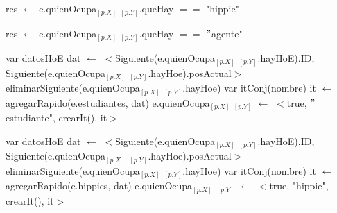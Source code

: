 \begin{algorithm}[H]
\begin{algorithmic}[1]
 
    \State res $\gets$ e.quienOcupa$_{[p.X]}$ $_{[p.Y]}$.queHay $==$ "hippie"
\EndFunction
\end{algorithmic}
\end{algorithm}

\begin{algorithm}[H]
\begin{algorithmic}[1]
 
    \State res $\gets$ e.quienOcupa$_{[p.X]}$ $_{[p.Y]}$.queHay $==$ $"$agente"
\EndFunction
\end{algorithmic}
\end{algorithm}

\begin{algorithm}[H]
\begin{algorithmic}[1]
 
    \State var datosHoE dat $\gets$ $<$Siguiente(e.quienOcupa$_{[p.X]}$ $_{[p.Y]}$.hayHoE).ID, Siguiente(e.quienOcupa$_{[p.X]}$ $_{[p.Y]}$.hayHoe).posActual$>$ 
    \State eliminarSiguiente(e.quienOcupa$_{[p.X]}$ $_{[p.Y]}$.hayHoe) 
    \State var itConj(nombre) it $\gets$ agregarRapido(e.estudiantes, dat) 
    \State e.quienOcupa$_{[p.X]}$ $_{[p.Y]}$ $\gets$ $<$true, $"$estudiante", crearIt(), it$>$ 
\EndFunction
\end{algorithmic}
\end{algorithm}

\begin{algorithm}[H]
\begin{algorithmic}[1]
 
    \State var datosHoE dat $\gets$ $<$Siguiente(e.quienOcupa$_{[p.X]}$ $_{[p.Y]}$.hayHoE).ID, Siguiente(e.quienOcupa$_{[p.X]}$ $_{[p.Y]}$.hayHoe).posActual$>$ 
    \State eliminarSiguiente(e.quienOcupa$_{[p.X]}$ $_{[p.Y]}$.hayHoe) 
    \State var itConj(nombre) it $\gets$ agregarRapido(e.hippies, dat) 
    \State e.quienOcupa$_{[p.X]}$ $_{[p.Y]}$ $\gets$ $<$true, "hippie", crearIt(), it$>$ 
\EndFunction
\end{algorithmic}
\end{algorithm}

